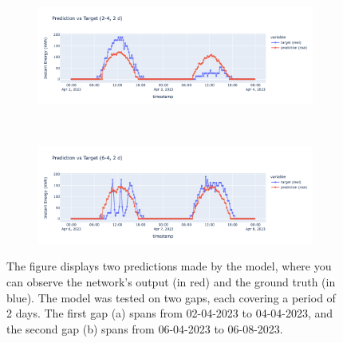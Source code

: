 \begin{figure}[H]
	\centering
	\begin{subfigure}{\textwidth}
		\centering
		\includegraphics[width=\textwidth]{chapters/3_models/imgs/ufnc/eval/ufcpred2-4.png}
		\caption{}
	\end{subfigure}\\
	\begin{subfigure}{\textwidth}
		\centering
		\includegraphics[width=\textwidth]{chapters/3_models/imgs/ufnc/eval/ufcpred6-4.png}
		\caption{}
	\end{subfigure}
	\caption{The figure displays two predictions made by the model, where you can observe the network's output (in red) and the ground truth (in blue). The model was tested on two gaps, each covering a period of 2 days. The first gap (a) spans from 02-04-2023 to 04-04-2023, and the second gap (b) spans from 06-04-2023 to 06-08-2023.}

	\label{fig:ufcnevalbelli}
\end{figure}


